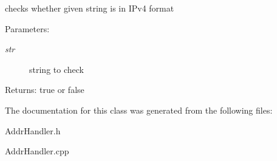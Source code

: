 checks whether given string is in IPv4 format 

\begin{Desc}
\item[Parameters:]
\begin{description}
\item[{\em str}]string to check \end{description}
\end{Desc}
\begin{Desc}
\item[Returns:]true or false \end{Desc}


The documentation for this class was generated from the following files:\begin{CompactItemize}
\item 
AddrHandler.h\item 
AddrHandler.cpp\end{CompactItemize}
